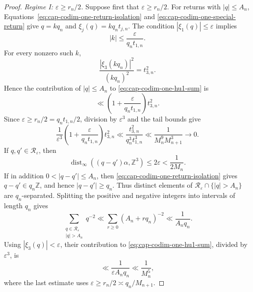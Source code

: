 \documentclass[11pt,reqno,a4paper]{amsart}
\numberwithin{equation}{section}
\theoremstyle{compact}
\theoremstyle{definition}
\theoremstyle{definition}
\begin{document}
\begin{proof}
\smallskip\noindent\emph{Regime I: $\varepsilon\geq r_n/2$.}
Suppose first that $\varepsilon\geq r_n/2$.  For returns with $|q|\leq A_n$,
Equations~\eqref{eq:cap-codim-one-return-isolation} and
\eqref{eq:cap-codim-one-special-return} give $q=kq_n$ and
$\xi_j(q)=kq_nt_{j,n}$.  The condition $|\xi_1(q)|\leq\varepsilon$ implies
\[
  |k|\leq \frac{\varepsilon}{q_nt_{1,n}}.
\]
For every nonzero such $k$,
\[
  \frac{|\xi_3(kq_n)|^2}{(kq_n)^2}=t_{3,n}^2.
\]
Hence the contribution of $|q|\leq A_n$ to
\eqref{eq:cap-codim-one-hu1-sum} is
\begin{equation}\label{eq:cap-codim-one-small-return-contribution}
  \ll
  \left(1+\frac{\varepsilon}{q_nt_{1,n}}\right)t_{3,n}^2.
\end{equation}
Since $\varepsilon\geq r_n/2=q_nt_{1,n}/2$, division by $\varepsilon^3$
and the tail bounds give
\begin{equation}\label{eq:cap-codim-one-small-return-normalized}
  \frac{1}{\varepsilon^3}
  \left(1+\frac{\varepsilon}{q_nt_{1,n}}\right)t_{3,n}^2
  \ll
  \frac{t_{3,n}^2}{q_n^3t_{1,n}^3}
  \ll\frac1{M_n^9M_{n+1}^3}
  \longrightarrow0.
\end{equation}
If $q,q'\in\mathcal R_\varepsilon$, then
\[
  \operatorname{dist}_\infty((q-q')\alpha,\mathbb Z^3)
  \leq 2\varepsilon<\frac1{2M_n}.
\]
If in addition $0<|q-q'|\leq A_n$, then
\eqref{eq:cap-codim-one-return-isolation} gives
$q-q'\in q_n\mathbb Z$, and hence $|q-q'|\geq q_n$.  Thus distinct elements
of $\mathcal R_\varepsilon\cap\{|q|>A_n\}$ are $q_n$-separated.  Splitting the
positive and negative integers into intervals of length $q_n$ gives
\[
  \sum_{\substack{q\in\mathcal R_\varepsilon\\|q|>A_n}}q^{-2}
  \ll \sum_{r\geq0}(A_n+rq_n)^{-2}
  \ll\frac1{A_nq_n}.
\]
Using $|\xi_3(q)|<\varepsilon$, their contribution to
\eqref{eq:cap-codim-one-hu1-sum}, divided by $\varepsilon^3$, is
\begin{equation}\label{eq:cap-codim-one-large-return-normalized}
  \ll\frac1{\varepsilon A_nq_n}
  \ll\frac1{M_n^5},
\end{equation}
where the last estimate uses
$\varepsilon\geq r_n/2\asymp q_n/M_{n+1}$.


\end{proof}
\end{document}
